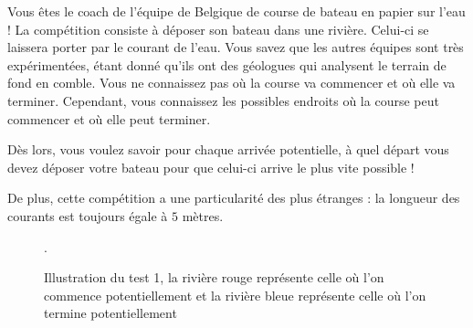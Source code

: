 \problemname{\problemyamlname}


\newcommand{\maxn}{}

Vous êtes le coach de l'équipe de Belgique de course de bateau en papier sur l'eau ! La compétition consiste à déposer son bateau dans une rivière. Celui-ci se laissera porter par le courant de l'eau.
Vous savez que les autres équipes sont très expérimentées, étant donné qu'ils ont des géologues qui analysent le terrain de fond en comble. Vous ne connaissez pas où la course va commencer et où elle va terminer. Cependant, vous connaissez les possibles endroits où la course peut commencer et où elle peut terminer.

Dès lors, vous voulez savoir pour chaque arrivée potentielle, à quel départ vous devez déposer votre bateau pour que celui-ci arrive le plus vite possible !

De plus, cette compétition a une particularité des plus étranges : la longueur des courants est toujours égale à $5$ mètres.

\begin{figure}[h]
    \begin{center}
    \end{center}
    \caption{Illustration du test 1, la rivière rouge représente celle où l'on commence potentiellement et la rivière bleue représente celle où l'on termine potentiellement}.
\end{figure}

